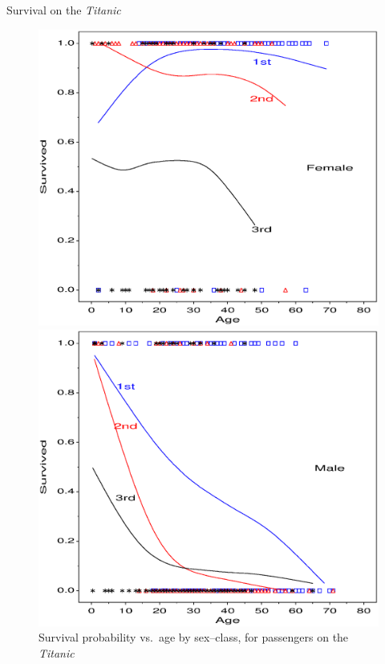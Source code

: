 \begin{Example}[titanic4]{Survival on the \emph{Titanic}}
\begin{figure}[htb]
 \begin{minipage}[t]{.49\linewidth}
  \includegraphics[width=1\linewidth]{ch6/fig/psurvive3}
 \end{minipage}%
 \hfill
 \begin{minipage}[t]{.49\linewidth}
  \includegraphics[width=1\linewidth]{ch6/fig/psurvive4}
 \end{minipage}
 \caption{Survival probability vs.\  age by sex--class, for passengers on the \emph{Titanic}}\label{fig:psurvive34}
\end{figure}


\end{Example}
